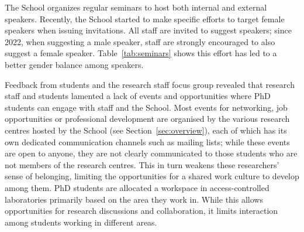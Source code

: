 The School organizes regular seminars to host both internal and external speakers. Recently, the School started to make specific efforts to target female speakers when issuing invitations.
All staff are invited to suggest speakers; since 2022, when suggesting a male speaker, staff are strongly encouraged to also suggest a female speaker. 
Table~\ref{tab:seminars} shows this effort has led to a better gender balance among speakers.



Feedback from students and the research staff focus group revealed that research staff and students lamented a lack of events and opportunities where PhD students can engage with staff and the School. 
Most events for networking, job opportunities or professional development are organised by the various research centres hosted by the School (see Section~\ref{sec:overview}), each of which has its own dedicated communication channels such as mailing lists; while these events are open to anyone, they are not clearly communicated to those students who are not members of the research centres. 
This in turn weakens these researchers' sense of belonging, limiting the opportunities for a shared work culture to develop among them. %
PhD students are allocated a workspace in access-controlled laboratories primarily based on the area they work in. %
While this allows opportunities for research discussions and collaboration, it limits interaction among students working in different areas. %

